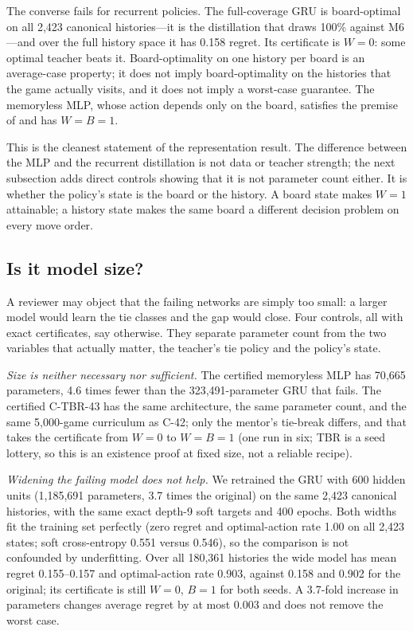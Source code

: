 \documentclass[conference]{IEEEtran}
\begin{document}
The converse fails for recurrent policies. The full-coverage GRU is board-optimal on all 2{,}423 canonical histories---it is the distillation that draws 100\% against M6---and over the full history space it has 0.158 regret. Its certificate is $W=0$: some optimal teacher beats it. Board-optimality on one history per board is an average-case property; it does not imply board-optimality on the histories that the game actually visits, and it does not imply a worst-case guarantee. The memoryless MLP, whose action depends only on the board, satisfies the premise of  and has $W=B=1$.

This is the cleanest statement of the representation result. The difference between the MLP and the recurrent distillation is not data or teacher strength; the next subsection adds direct controls showing that it is not parameter count either. It is whether the policy's state is the board or the history. A board state makes $W=1$ attainable; a history state makes the same board a different decision problem on every move order.

\subsection{Is it model size?}
\label{sec:size}
A reviewer may object that the failing networks are simply too small: a larger model would learn the tie classes and the gap would close. Four controls, all with exact certificates, say otherwise. They separate parameter count from the two variables that actually matter, the teacher's tie policy and the policy's state.

\emph{Size is neither necessary nor sufficient.} The certified memoryless MLP has 70{,}665 parameters, 4.6 times fewer than the 323{,}491-parameter GRU that fails. The certified C-TBR-43 has the same architecture, the same parameter count, and the same 5{,}000-game curriculum as C-42; only the mentor's tie-break differs, and that takes the certificate from $W=0$ to $W=B=1$ (one run in six; TBR is a seed lottery, so this is an existence proof at fixed size, not a reliable recipe).

\emph{Widening the failing model does not help.} We retrained the GRU with 600 hidden units (1{,}185{,}691 parameters, 3.7 times the original) on the same 2{,}423 canonical histories, with the same exact depth-9 soft targets and 400 epochs. Both widths fit the training set perfectly (zero regret and optimal-action rate 1.00 on all 2{,}423 states; soft cross-entropy 0.551 versus 0.546), so the comparison is not confounded by underfitting. Over all 180{,}361 histories the wide model has mean regret 0.155--0.157 and optimal-action rate 0.903, against 0.158 and 0.902 for the original; its certificate is still $W=0$, $B=1$ for both seeds. A 3.7-fold increase in parameters changes average regret by at most 0.003 and does not remove the worst case.
\end{document}
